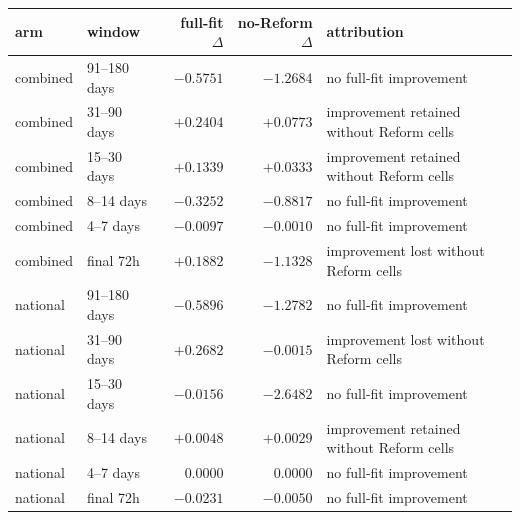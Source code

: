 \begin{tabular}{llrrl}
\toprule
arm & window & full-fit $\Delta$ & no-Reform $\Delta$ & attribution \\
\midrule
combined & 91--180 days & $-0.5751$ & $-1.2684$ & no full-fit improvement \\
combined & 31--90 days  & $+0.2404$ & $+0.0773$ & improvement retained without Reform cells \\
combined & 15--30 days  & $+0.1339$ & $+0.0333$ & improvement retained without Reform cells \\
combined & 8--14 days   & $-0.3252$ & $-0.8817$ & no full-fit improvement \\
combined & 4--7 days    & $-0.0097$ & $-0.0010$ & no full-fit improvement \\
combined & final 72h    & $+0.1882$ & $-1.1328$ & improvement lost without Reform cells \\
national & 91--180 days & $-0.5896$ & $-1.2782$ & no full-fit improvement \\
national & 31--90 days  & $+0.2682$ & $-0.0015$ & improvement lost without Reform cells \\
national & 15--30 days  & $-0.0156$ & $-2.6482$ & no full-fit improvement \\
national & 8--14 days   & $+0.0048$ & $+0.0029$ & improvement retained without Reform cells \\
national & 4--7 days    & $\phantom{+}0.0000$ & $\phantom{+}0.0000$ & no full-fit improvement \\
national & final 72h    & $-0.0231$ & $-0.0050$ & no full-fit improvement \\
\bottomrule
\end{tabular}
